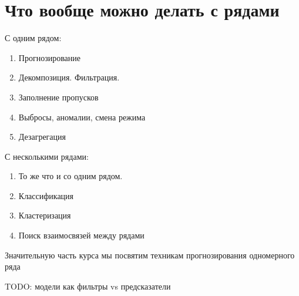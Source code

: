 \section{Что вообще можно делать с рядами}

С одним рядом:

\begin{enumerate}
  \item Прогнозирование
  \item Декомпозиция. Фильтрация.
  \item Заполнение пропусков
  \item Выбросы, аномалии, смена режима
  \item Дезагрегация
\end{enumerate}

С несколькими рядами:

\begin{enumerate}
  \item То же что и со одним рядом.
  \item Классификация
  \item Кластеризация
  \item Поиск взаимосвязей между рядами
\end{enumerate}

Значительную часть курса мы посвятим техникам прогнозирования одномерного ряда

TODO: модели как фильтры vs предсказатели